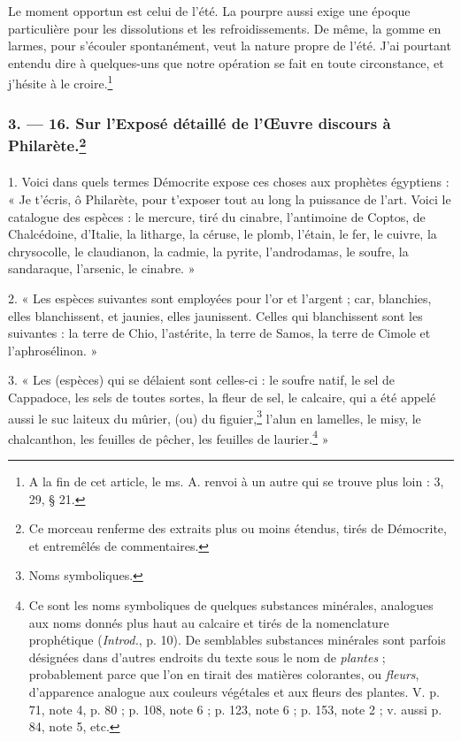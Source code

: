 \documentclass[landscape, a4paper, 11pt, oneside, polutonikogreek, french]{article}
\begin{document}
Le moment opportun est celui de l'été. La pourpre aussi exige une époque particulière pour les dissolutions et les refroidissements. De même, la gomme en larmes, pour s'écouler spontanément, veut la nature propre de l'été. J'ai pourtant entendu dire à quelques-uns que notre opération se fait en toute circonstance, et j'hésite à le croire.\footnote{A la fin de cet article, le ms. A. renvoi à un autre qui se trouve plus loin : 3, 29, § 21.}
\clearpage
\bigskip
\centerline{\EightStarTaper}
\centerline{\EightStarTaper\EightStarTaper}
\bigskip

\subsubsection[3. --- 16. Sur l'Exposé détaillé de l'Œuvre discours à Philarète.]{3. --- 16. Sur l'Exposé détaillé de l'Œuvre discours à Philarète.\footnote{Ce morceau renferme des extraits plus ou moins étendus, tirés de Démocrite, et entremêlés de commentaires.}}
\paragraph{}
1. Voici dans quels termes Démocrite expose ces choses aux prophètes égyptiens : « Je t'écris, ô Philarète, pour t'exposer tout au long la puissance de l'art. Voici le catalogue des espèces : le mercure, tiré du cinabre, l'antimoine de Coptos, de Chalcédoine, d'Italie, la litharge, la céruse, le plomb, l'étain, le fer, le cuivre, la chrysocolle, le claudianon, la cadmie, la pyrite, l'androdamas, le soufre, la sandaraque, l'arsenic, le cinabre. »

2. « Les espèces suivantes sont employées pour l'or et l'argent ; car, blanchies, elles blanchissent, et jaunies, elles jaunissent. Celles qui blanchissent sont les suivantes : la terre de Chio, l'astérite, la terre de Samos, la terre de Cimole et l'aphrosélinon. »

3. « Les (espèces) qui se délaient sont celles-ci : le soufre natif, le sel de Cappadoce, les sels de toutes sortes, la fleur de sel, le calcaire, qui a été appelé aussi le suc laiteux du mûrier, (ou) du figuier,\footnote{Noms symboliques.} l'alun en lamelles, le misy, le chalcanthon, les feuilles de pêcher, les feuilles de laurier.\footnote{Ce sont les noms symboliques de quelques substances minérales, analogues aux noms donnés plus haut au calcaire et tirés de la nomenclature prophétique (\emph{Introd.}, p. 10). De semblables substances minérales sont parfois désignées dans d'autres endroits du texte sous le nom de \emph{plantes} ; probablement parce que l'on en tirait des matières colorantes, ou \emph{fleurs}, d'apparence analogue aux couleurs végétales et aux fleurs des plantes. V. p. 71, note 4, p. 80 ; p. 108, note 6 ; p. 123, note 6 ; p. 153, note 2 ; v. aussi p. 84, note 5, etc.} »
\end{document}

